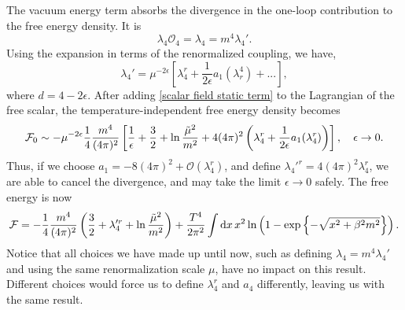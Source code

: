 The vacuum energy term absorbs the divergence in the one-loop contribution to the free energy density.
It is
%
\begin{equation}
    \label{scalar field static term}
    \lambda_4 \mathcal{O}_4 = \lambda_4 = m^4 \lambda_4'.
\end{equation}
%
Using the expansion in terms of the renormalized coupling, we have, 
%
\begin{equation}
    \lambda_4' = \mu^{- 2 \epsilon}\left[ \lambda_4^r + \frac{1}{2 \epsilon} a_1(\lambda_r^4) + ... \right],
\end{equation}
%
where $d = 4 - 2\epsilon$.
After adding \autoref{scalar field static term} to the Lagrangian of the free scalar, the temperature-independent free energy density becomes
%
\begin{equation}
    \mathcal{F}_0 \sim - \mu^{-2 \epsilon}  \frac{1}{4} \frac{m^4}{(4 \pi)^2}  
    \left[
        \frac{1}{\epsilon} + \frac{3}{2} + \ln{\frac{\tilde \mu^2}{m^2}}
        + 4 (4 \pi)^2 \left(\lambda_4^r + \frac{1}{2\epsilon} a_1(\lambda_4^r)\right)
    \right],
    \quad \epsilon \rightarrow 0.
\end{equation}
%
Thus, if we choose $a_1 = -8 (4\pi)^2 + \mathcal{O}(\lambda_4^r)$, and define $\lambda_4'^r = 4(4\pi)^2\lambda_4^r$, we are able to cancel the divergence, and may take the limit $\epsilon \rightarrow 0$ safely.
The free energy is now
%
\begin{equation}
    \mathcal{F} = -\frac{1}{4} \frac{m^4}{(4 \pi)^2} 
    \left(
        \frac{3}{2} + \lambda_4'^r + \ln \frac{\tilde \mu^2}{m^2}
    \right)
    +
    \frac{T^4}{2\pi^2} \int \text{d} x \, x^2 \ln\left(1 - \text{exp} \left\{ -\sqrt{x^2 + \beta^2 m^2} \right\}\right).
\end{equation}
%
Notice that all choices we have made up until now, such as defining $\lambda_4 = m^4 \lambda_4'$ and using the same renormalization scale $\mu$, have no impact on this result.
Different choices would force us to define $\lambda_4^r$ and $a_4$ differently, leaving us with the same result.

